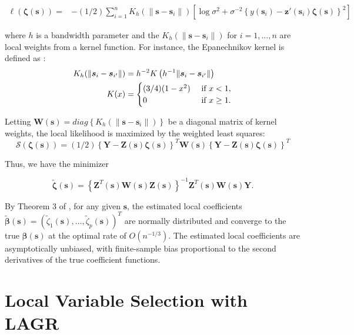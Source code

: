 \documentclass[12pt,english,authoryear, review]{article}\usepackage[]{graphicx}\usepackage[]{color}
\theoremstyle{plain}
\theoremstyle{plain}
\begin{document}
\begin{align}
\ell\left(\bm{\zeta}(\bm{s})\right)= & -(1/2)\sum_{i=1}^{n}K_{h}(\|\bm{s}-\bm{s}_{i}\|)\left[\log\sigma^{2}+\sigma^{-2}\left\{ y\left(\bm{s}_{i}\right)-\bm{z}'\left(\bm{s}_{i}\right)\bm{\zeta}\left(\bm{s}\right)\right\} ^{2}\right]\label{eq:local-log-likelihood}
\end{align}


where $h$ is a bandwidth parameter and the $K_{h}\left(\|\bm{s}-\bm{s}_{i}\|\right)$
for $i=1,\dots,n$ are local weights from a kernel function. For instance,
the Epanechnikov kernel is defined as \citep{Samiuddin-el-Sayyad-1990}:
\begin{align}
K_{h}(\|\bm{s}_{i}-\bm{s}_{i'}\|) & =h^{-2}K\left(h^{-1}\|\bm{s}_{i}-\bm{s}_{i'}\|\right)\notag\label{eq:epanechnikov}\\
K(x) & =\begin{cases}
(3/4)(1-x^{2}) & \mbox{ if }x<1,\\
0 & \mbox{ if }x\geq1.
\end{cases}
\end{align}


Letting $\bm{W}(\bm{s})=diag\left\{ K_{h}(\|\bm{s}-\bm{s}_{i}\|)\right\} $
be a diagonal matrix of kernel weights, the local likelihood is maximized
by the weighted least squares: 
\[
\mathcal{S}\left(\bm{\zeta}\left(\bm{s}\right)\right)=(1/2)\left\{ \bm{Y}-\bm{Z}(\bm{s})\bm{\zeta}(\bm{s})\right\} ^{T}\bm{W}(\bm{s})\left\{ \bm{Y}-\bm{Z}(\bm{s})\bm{\zeta}(\bm{s})\right\} ^{T}
\]


Thus, we have the minimizer

\begin{equation}
\tilde{\bm{\zeta}}(\bm{s})=\left\{ \bm{Z}^{T}(\bm{s})\bm{W}(\bm{s})\bm{Z}(\bm{s})\right\} ^{-1}\bm{Z}^{T}(\bm{s})\bm{W}(\bm{s})\bm{Y}.\label{eq:zeta-hat}
\end{equation}


By Theorem 3 of \citet{Sun-Yan-Zhang-Lu-2014}, for any given $\bm{s}$,
the estimated local coefficients $\tilde{\bm{\beta}}\left(\bm{s}\right)=\left(\tilde{\zeta}_{1}\left(\bm{s}\right),\dots,\tilde{\zeta}_{p}\left(\bm{s}\right)\right)^{T}$
are normally distributed and converge to the true $\bm{\beta}\left(\bm{s}\right)$
at the optimal rate of $O\left(n^{-1/3}\right)$. The estimated local
coefficients are asymptotically unbiased, with finite-sample bias
proportional to the second derivatives of the true coefficient functions.


\section{Local Variable Selection with LAGR\label{sec:lagr-gaussian}}
\end{document}
